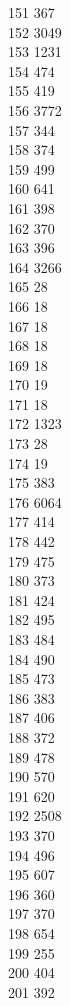 { 151	367 \\
 152	3049 \\
 153	1231 \\
 154	474 \\
 155	419 \\
 156	3772 \\
 157	344 \\
 158	374 \\
 159	499 \\
 160	641 \\
 161	398 \\
 162	370 \\
 163	396 \\
 164	3266 \\
 165	28 \\
 166	18 \\
 167	18 \\
 168	18 \\
 169	18 \\
 170	19 \\
 171	18 \\
 172	1323 \\
 173	28 \\
 174	19 \\
 175	383 \\
 176	6064 \\
 177	414 \\
 178	442 \\
 179	475 \\
 180	373 \\
 181	424 \\
 182	495 \\
 183	484 \\
 184	490 \\
 185	473 \\
 186	383 \\
 187	406 \\
 188	372 \\
 189	478 \\
 190	570 \\
 191	620 \\
 192	2508 \\
 193	370 \\
 194	496 \\
 195	607 \\
 196	360 \\
 197	370 \\
 198	654 \\
 199	255 \\
 200	404 \\
 201	392 \\
}
